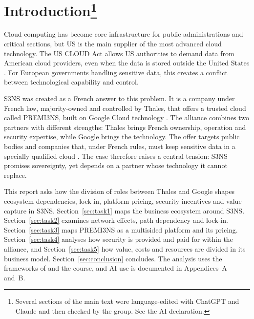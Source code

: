 \section[Introduction]{Introduction\footnote{Several sections of the main text were language-edited with ChatGPT \parencite{openai2026} and Claude \parencite{anthropic2026} and then checked by the group. See the AI declaration.}}
\label{sec:intro}
Cloud computing has become core infrastructure for public administrations and critical sections, but US is the main supplier of the most advanced cloud technology. The US CLOUD Act allows US authorities to demand data from American cloud providers, even when the data is stored outside the United States \parencite{doj2019cloudact}. For European governments handling sensitive data, this creates a conflict between technological capability and control. 

S3NS was created as a French answer to this problem. It is a company under
French law, majority-owned and controlled by Thales, that offers a trusted cloud called PREMI3NS,
built on Google Cloud technology \parencite{s3ns2025premi3ns}. The alliance
combines two partners with different strengths: Thales brings French ownership,
operation and security expertise, while Google brings the technology. The
offer targets public bodies and companies that, under French rules, must keep
sensitive data in a specially qualified cloud \parencite{decretsren2026}. The
case therefore raises a central tension: S3NS promises sovereignty, yet depends
on a partner whose technology it cannot replace.

This report asks how the division of roles between Thales and Google shapes
ecosystem dependencies, lock-in, platform pricing, security incentives and value
capture in S3NS. Section~\ref{sec:task1} maps the business ecosystem around
S3NS. Section~\ref{sec:task2} examines network effects, path dependency and
lock-in. Section~\ref{sec:task3} maps PREMI3NS as a multisided platform and its
pricing. Section~\ref{sec:task4} analyses how security is provided and paid for
within the alliance, and Section~\ref{sec:task5} how value, costs and resources
are divided in its business model. Section~\ref{sec:conclusion} concludes. The
analysis uses the frameworks of \textcite{overby2021} and the course, and AI use
is documented in Appendices~A and~B.
